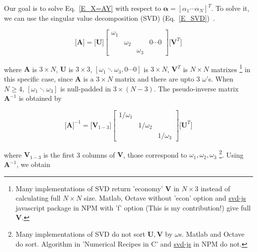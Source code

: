 \documentclass[dvipdfmx,uplatex,a4paper]{article}
\begin{document}
Our goal is to solve Eq.~\eqref{E_X=AY} with respect to $ \boldsymbol{\alpha} = [\alpha_1 \cdots \alpha_N]^T $. To solve it, we can use the singular value decomposition (SVD) (Eq.~\eqref{E_SVD})~\cite{SVD_NRC}.

\begin{equation}
  \label{E_SVD}
  \Bigg[ \boldsymbol{A} \Bigg] =
  \Bigg[ \boldsymbol{U} \Bigg]
  \left[
    \begin{array}{cccc}
      \omega_1 & \\
        & \omega_2 &   &  0 \cdots 0 \\
        &  & \omega_3 &
    \end{array}
  \right]
  \Bigg[ \boldsymbol{V}^T \Bigg]
\end{equation}

\noindent
where $ \boldsymbol{A} $ is $ 3 \times N $,
$ \boldsymbol{U} $ is $ 3 \times 3 $,
$ [\omega_1 \ddots \omega_3, 0 \cdots 0] $ is $ 3 \times N $,
$ \boldsymbol{V}^T $ is $ N \times N $ matrixes
\footnote{Many implementations of SVD return 'economy' $\boldsymbol{V}$ in $ N \times 3$ instead of calculating full $N \times N$ size. Matlab, Octave without 'econ' option and \href{https://www.npmjs.com/package/svd-js}{svd-js} javascript package in NPM with 'f' option (This is my contribution!) give full $\boldsymbol{V}$.}
in this specific case, since $ \boldsymbol{A} $ is a $ 3 \times N $ matrix and there are upto 3 $\omega$'s. When $ N \geq 4 $, $ [\omega_1 \ddots \omega_3 ] $ is null-padded in $ 3 \times (N-3) $.
The pseudo-inverse matrix $ \boldsymbol{A}^{-1} $ is obtained by

\begin{equation}
  \Bigg[ \boldsymbol{A} \Bigg]^{-1} =
  \Bigg[ \boldsymbol{V}_{1-3} \Bigg]
  \left[
    \begin{array}{ccc}
      1/\omega_1 & & \\
      & 1/\omega_2 & \\
      & & 1/\omega_3
    \end{array}
  \right]
  \Bigg[ \boldsymbol{U}^T \Bigg]
\end{equation}

\noindent
where $ \boldsymbol{V}_{1-3} $ is the first 3 columns of $ \boldsymbol{V} $, those correspond to $ \omega_1, \omega_2, \omega_3 $
\footnote{Many implementations of SVD do not sort $ \boldsymbol{U}, \boldsymbol{V}$ by $\omega$s. Matlab and Octave do sort. Algorithm in 'Numerical Recipes in C' and \href{https://www.npmjs.com/package/svd-js}{svd-js} in NPM do not.}.
Using $ \boldsymbol{A}^{-1} $, we obtain
\end{document}

